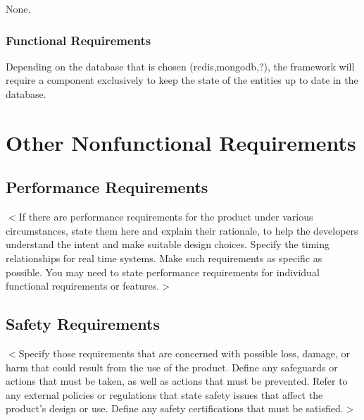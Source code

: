 \documentclass{scrreprt}
\begin{document}
\begin{itemize}[noitemsep]
None.

\subsection{Functional Requirements}


Depending on the database that is chosen (redis,mongodb,?), the framework will require a component exclusively to keep the state of the entities up to date in the database.


\end{itemize}

\chapter{Other Nonfunctional Requirements}

\section{Performance Requirements}
$<$If there are performance requirements for the product under various 
circumstances, state them here and explain their rationale, to help the 
developers understand the intent and make suitable design choices. Specify the 
timing relationships for real time systems. Make such requirements as specific 
as possible. You may need to state performance requirements for individual 
functional requirements or features.$>$

\section{Safety Requirements}
$<$Specify those requirements that are concerned with possible loss, damage, or 
harm that could result from the use of the product. Define any safeguards or 
actions that must be taken, as well as actions that must be prevented. Refer to 
any external policies or regulations that state safety issues that affect the 
product’s design or use. Define any safety certifications that must be 
satisfied.$>$
\end{document}
